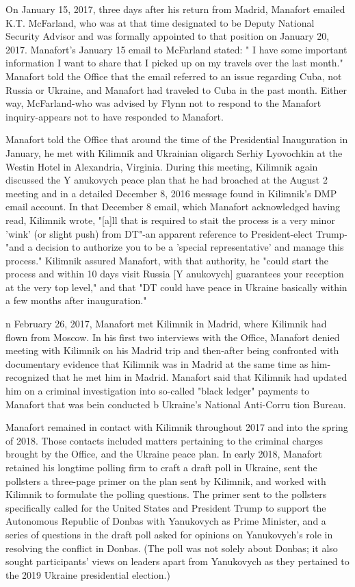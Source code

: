 On January 15, 2017, three days after his return from Madrid, Manafort emailed K.T. McFarland, who was at that time designated to be Deputy National Security Advisor and was formally appointed to that position on January 20, 2017.%
Manafort's January 15 email to McFarland stated: " I have some important information I want to share that I picked up on my travels over the last month."%
Manafort told the Office that the email referred to an issue regarding Cuba, not Russia or Ukraine, and Manafort had traveled to Cuba in the past month.%
Either way, McFarland-who was advised by Flynn not to respond to the Manafort inquiry-appears not to have responded to Manafort.%

Manafort told the Office that around the time of the Presidential Inauguration in January, he met with Kilimnik and Ukrainian oligarch Serhiy Lyovochkin at the Westin Hotel in Alexandria, Virginia.%
During this meeting, Kilimnik again discussed the Y anukovych peace plan that he had broached at the August 2 meeting and in a detailed December 8, 2016 message found in Kilimnik's DMP email account.%
In that December 8 email, which Manafort acknowledged having read,%
Kilimnik wrote, "[a]ll that is required to stait the process is a very minor 'wink' (or slight push) from DT"-an apparent reference to President-elect Trump-"and a decision to authorize you to be a 'special representative' and manage this process." Kilimnik assured Manafort, with that authority, he "could start the process and within 10 days visit Russia [Y anukovych] guarantees your reception at the very top level," and that "DT could have peace in Ukraine basically within a few months after inauguration."%

n February 26, 2017, Manafort met Kilimnik in Madrid, where Kilimnik had flown from Moscow.%
In his first two interviews with the Office, Manafort denied meeting with Kilimnik on his Madrid trip and then-after being confronted with documentary evidence that Kilimnik was in Madrid at the same time as him-recognized that he met him in Madrid. Manafort said that Kilimnik had updated him on a criminal investigation into so-called "black ledger" payments to Manafort that was bein conducted b Ukraine's National Anti-Corru tion Bureau.%

Manafort remained in contact with Kilimnik throughout 2017 and into the spring of 2018. Those contacts included matters pertaining to the criminal charges brought by the Office,%
and the Ukraine peace plan. In early 2018, Manafort retained his longtime polling firm to craft a draft poll in Ukraine, sent the pollsters a three-page primer on the plan sent by Kilimnik, and worked with Kilimnik to formulate the polling questions.%
The primer sent to the pollsters specifically called for the United States and President Trump to support the Autonomous Republic of Donbas with Yanukovych as Prime Minister,%
and a series of questions in the draft poll asked for opinions on Yanukovych's role in resolving the conflict in Donbas.%
(The poll was not solely about Donbas; it also sought participants' views on leaders apart from Yanukovych as they pertained to the 2019 Ukraine presidential election.)

